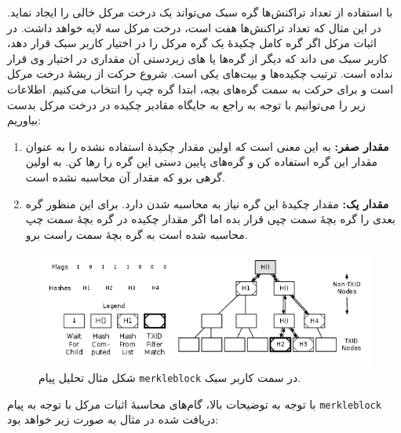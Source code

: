 با استفاده از تعداد تراکنش‌ها گره سبک می‌تواند یک درخت مرکل خالی را ایجاد نماید. در این مثال که تعداد تراکنش‌ها هفت است، درخت مرکل سه لایه خواهد داشت. در اثبات مرکل اگر گره کامل چکیدهٔ یک گره مرکل را در اختیار کاربر سبک قرار دهد، کاربر سبک می داند که دیگر از گره‌ها یا های زیردستی آن مقداری در اختیار وی قرار نداده است. ترتیب چکیده‌ها و بیت‌های  یکی است. شروع حرکت از ریشهٔ درخت مرکل است و برای حرکت به سمت گره‌های بچه، ابتدا گره چپ را انتخاب می‌کنیم. اطلاعات زیر را می‌توانیم با توجه به  راجع به جایگاه مقادیر چکیده در درخت مرکل بدست بیاوریم:
\begin{enumerate}
	\item{%
	\textbf{مقدار صفر:}
	به این معنی است که اولین مقدار چکیدهٔ استفاده نشده را به عنوان مقدار این گره استفاده کن و گره‌های پایین دستی این گره را رها کن. به اولین گرهی برو که مقدار آن محاسبه نشده است.
}
	\item{%
	\textbf{مقدار یک:}
	مقدار چکیدهٔ این گره نیاز به محاسبه شدن دارد. برای این منظور گره بعدی را گره بچهٔ سمت چپی قرار بده اما اگر مقدار چکیده در گره بچهٔ سمت چپ محاسبه شده است به گره بچهٔ سمت راست برو.
}
\end{enumerate}

\begin{figure}
	\centering
	\includegraphics[width=\linewidth]{image/merkleblock-parsing}
	\caption{شکل مثال تحلیل پیام \texttt{merkleblock} در سمت کاربر سبک.\cite{P2P_ref}}
	\label{fig:merkleblock-parsing}
\end{figure}

با توجه به توضیحات بالا، گام‌های محاسبهٔ اثبات مرکل با توجه به پیام \texttt{merkleblock} دریافت شده در مثال به صورت زیر خواهد بود:

